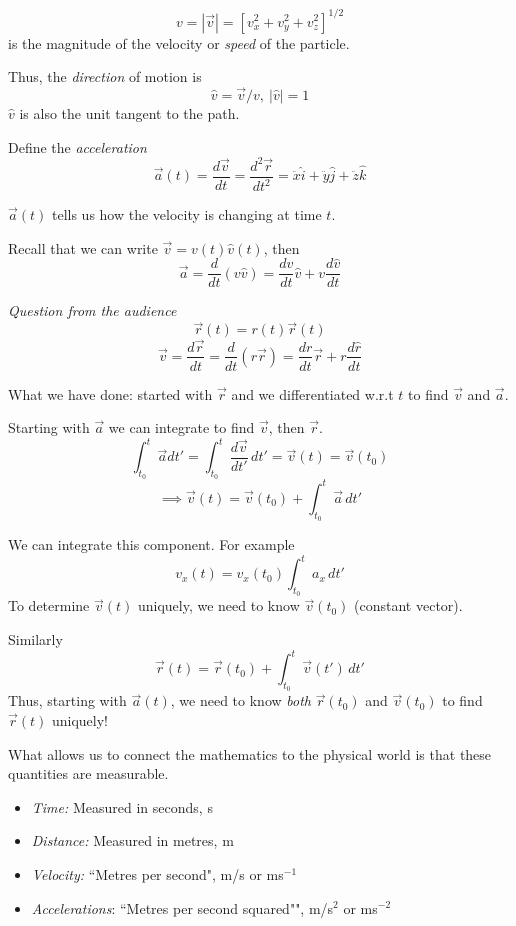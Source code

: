 \begin{definition}
\[v = |\vec{v}| = [v_x^2 + v_y^2 + v_z^2]^{1/2}\]
is the magnitude of the velocity or \emph{speed} of the particle.

Thus, the \emph{direction} of motion is 
\[\hat{v} = \vec{v}/v,~ |\hat{v}| = 1\]
$\hat{v}$ is also the unit tangent to the path.

Define the \emph{acceleration}
\[\vec{a}(t) = \frac{d\vec{v}}{dt} = \frac{d^2\vec{r}}{dt^2} = \ddot{x}\hat{i} + \ddot{y}\hat{j} + \ddot{z}\hat{k}\]
\end{definition}

$\vec{a}(t)$ tells us how the velocity is changing at time $t$. 

Recall that we can write $\vec{v} = v(t)\hat{v}(t)$, then
\[\vec{a} = \frac{d}{dt}(v\hat{v}) = \frac{dv}{dt}\hat{v} + v\frac{d\hat{v}}{dt}\]

\emph{Question from the audience} 
\[\vec{r}(t) = r(t)\vec{r}(t)\]
\[\vec{v} = \frac{d\vec{r}}{dt} = \frac{d}{dt}(r\vec{r}) = \frac{dr}{dt}\vec{r} + r\frac{d\hat{r}}{dt}\]

What we have done: started with $\vec{r}$ and we differentiated w.r.t $t$ to find $\vec{v}$ and $\vec{a}$. 

Starting with $\vec{a}$ we can integrate to find $\vec{v}$, then $\vec{r}$. 
\[\int_{t_0}^{t} \vec{a}dt' = \int_{t_0}^{t} \frac{d\vec{v}}{dt'}\,dt' = \vec{v}(t) = \vec{v}(t_0)
\]
\[\implies \vec{v}(t) = \vec{v}(t_0) + \int_{t_0}^t \vec{a}\,dt'\]

We can integrate this component. For example 
\[v_x(t) = v_x(t_0) \int_{t_0}^t a_x\,dt'\]
To determine $\vec{v}(t)$ uniquely, we need to know $\vec{v}(t_0)$ (constant vector). 

Similarly
\[\vec{r}(t) = \vec{r}(t_0) + \int_{t_0}^t \vec{v}(t')\,dt'\]
Thus, starting with $\vec{a}(t)$, we need to know \emph{both} $\vec{r}(t_0)$ and $\vec{v}(t_0)$ to find $\vec{r}(t)$ uniquely! 

What allows us to connect the mathematics to the physical world is that these quantities are measurable. \\

\begin{definition}[SI Units]\begin{itemize}
\item \emph{Time:} Measured in seconds, s

\item \emph{Distance:} Measured in metres, m

\item \emph{Velocity:} ``Metres per second", m/s or ms$^{-1}$
	
\item \emph{Accelerations}: ``Metres per second squared"", m/s$^2$ or ms$^{-2}$
\end{itemize}
\end{definition}

